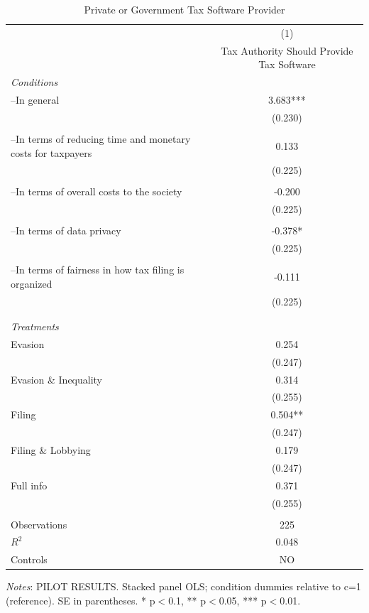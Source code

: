 \documentclass[11pt]{article}
\begin{document}
\FloatBarrier
\begin{table}[!htbp]\centering
\caption{Private or Government Tax Software Provider}
\label{tab:taxsoftwareprovider_noc}
\begin{threeparttable}
\footnotesize
\begin{tabular}{l|c}
\toprule
 & (1)\\
 & Tax Authority Should Provide Tax Software \\
\midrule
\textit{Conditions} \\[0.25em]
--In general & 3.683*** \\
 & (0.230) \\\\[0.25em]
--In terms of reducing time and monetary costs for taxpayers & 0.133 \\
 & (0.225) \\\\[0.25em]
--In terms of overall costs to the society & -0.200 \\
 & (0.225) \\\\[0.25em]
--In terms of data privacy & -0.378* \\
 & (0.225) \\\\[0.25em]
--In terms of fairness in how tax filing is organized & -0.111 \\
 & (0.225) \\\\[0.25em]
\\[1em]
\textit{Treatments} \\[0.25em]
Evasion & 0.254 \\
 & (0.247) \\
Evasion \& Inequality & 0.314 \\
 & (0.255) \\
Filing & 0.504** \\
 & (0.247) \\
Filing \& Lobbying & 0.179 \\
 & (0.247) \\
Full info & 0.371 \\
 & (0.255) \\
\\[0.5em]
\midrule
Observations & 225 \\
$R^2$ & 0.048 \\
Controls & NO \\
\bottomrule
\end{tabular}
\begin{tablenotes}[flushleft]
\footnotesize
\item \textit{Notes}: PILOT RESULTS. Stacked panel OLS; condition dummies relative to c=1 (reference). SE in parentheses. * p$<$0.1, ** p$<$0.05, *** p$<$0.01.
\end{tablenotes}
\end{threeparttable}
\end{table}
\end{document}
